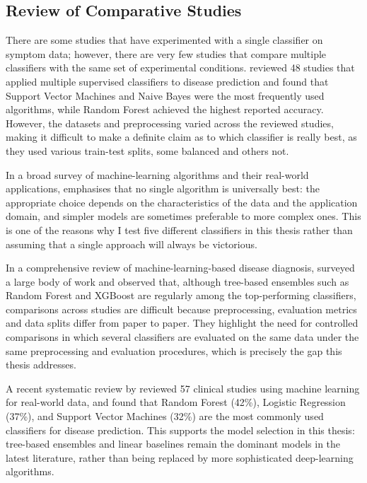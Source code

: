 \subsection{Review of Comparative Studies}

There are some studies that have experimented with a single classifier on symptom data; however, there are very few studies that compare multiple classifiers with the same set of experimental conditions. \citet{Uddin2019} reviewed 48 studies that applied multiple supervised classifiers to disease prediction and found that Support Vector Machines and Naive Bayes were the most frequently used algorithms, while Random Forest achieved the highest reported accuracy. However, the datasets and preprocessing varied across the reviewed studies, making it difficult to make a definite claim as to which classifier is really best, as they used various train-test splits, some balanced and others not.

In a broad survey of machine-learning algorithms and their real-world applications, \citet{Sarker2021} emphasises that no single algorithm is universally best: the appropriate choice depends on the characteristics of the data and the application domain, and simpler models are sometimes preferable to more complex ones. This is one of the reasons why I test five different classifiers in this thesis rather than assuming that a single approach will always be victorious.

In a comprehensive review of machine-learning-based disease diagnosis, \citet{Ahsan2022} surveyed a large body of work and observed that, although tree-based ensembles such as Random Forest and XGBoost are regularly among the top-performing classifiers, comparisons across studies are difficult because preprocessing, evaluation metrics and data splits differ from paper to paper. They highlight the need for controlled comparisons in which several classifiers are evaluated on the same data under the same preprocessing and evaluation procedures, which is precisely the gap this thesis addresses.

A recent systematic review by \citet{Alhumaidi2025} reviewed 57 clinical studies using machine learning for real-world data, and found that Random Forest (42\%), Logistic Regression (37\%), and Support Vector Machines (32\%) are the most commonly used classifiers for disease prediction. This supports the model selection in this thesis: tree-based ensembles and linear baselines remain the dominant models in the latest literature, rather than being replaced by more sophisticated deep-learning algorithms.

